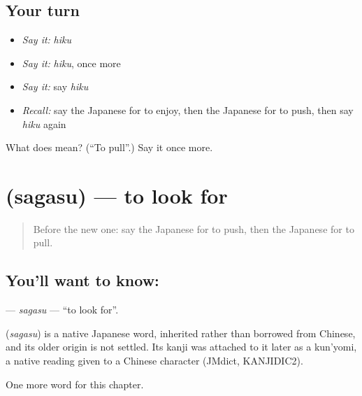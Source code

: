 \subsection*{Your turn}
\begin{itemize}
\raggedright
  \item \emph{Say it:} \emph{hiku}
  \item \emph{Say it:} \emph{hiku}, once more
  \item \emph{Say it:} say \emph{hiku}
  \item \emph{Recall:} say the Japanese for to enjoy, then the Japanese for to push, then say \emph{hiku} again
\end{itemize}

\begin{tcolorbox}[breakable,colback=teal!4,colframe=teal!35!black,title={Before you move on}]
What does  mean? (\textquotedblleft{}To pull\textquotedblright{}.) Say it once more.
\end{tcolorbox}
\section[\texorpdfstring{\ja{さがす} (sagasu)}{さがす (sagasu)}]{ (sagasu) — to look for}

\label{lesson:JA-C30-sagasu}



\begin{quote}
Before the new one: say the Japanese for to push, then the Japanese for to pull.
\end{quote}

\subsection*{You'll want to know: }
\textbf{} — \emph{sagasu} — \textquotedblleft{}to look for\textquotedblright{}.

\begin{cousinweb}
\textbf{} (\emph{sagasu}) is a native Japanese word, inherited rather than borrowed from Chinese, and its older origin is not settled. Its kanji was attached to it later as a kun'yomi, a native reading given to a Chinese character (JMdict, KANJIDIC2).
\end{cousinweb}

\begin{grammarlens}[title={What you've built}]
One more word for this chapter.
\end{grammarlens}

